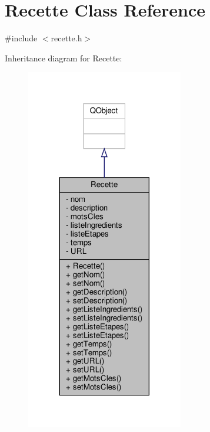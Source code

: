 \hypertarget{classRecette}{}\section{Recette Class Reference}
\label{classRecette}


{\ttfamily \#include $<$recette.\+h$>$}



Inheritance diagram for Recette\+:
\nopagebreak
\begin{figure}[H]
\begin{center}
\leavevmode
\includegraphics[width=194pt]{classRecette__inherit__graph}
\end{center}
\end{figure}


